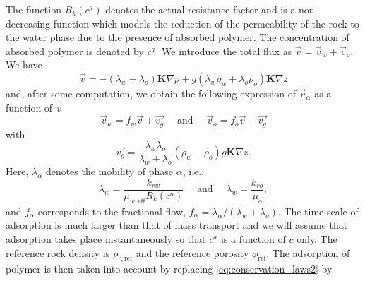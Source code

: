 \documentclass[11pt]{amsart}
\newcommand{\cads}{c^a}
\newcommand{\eff}{\mathrm{eff}}
\newcommand{\Kb}{{\bm{K}}}
\begin{document}
The function $R_k(\cads)$ denotes the actual resistance factor and is a non-decreasing function
which models the reduction of the permeability of the rock to the water phase due to the presence of
absorbed polymer. The concentration of absorbed polymer is denoted by $\cads$. We introduce the
total flux as $\vec{v} = \vec{v}_w + \vec{v}_o$. We have
\begin{equation*}
  \vec{v} = -(\lambda_w + \lambda_o)\Kb\nabla p + g(\lambda_w\rho_w + \lambda_o\rho_o)\Kb\nabla z 
\end{equation*}
and, after some computation, we obtain the following expression of $\vec{v}_\alpha$ as a function of
$\vec{v}$
\begin{equation}
  \label{eq:valphav}
  \vec{v}_w = f_w \vec{v} + \vec{v_g}\quad\text{ and }\quad  \vec{v}_o = f_o \vec{v} - \vec{v_g}
\end{equation}
with
\begin{equation}
  \label{eq:gravterm}
  \vec{v_g} = \frac{\lambda_w\lambda_{o}}{\lambda_w+\lambda_{o}}(\rho_w-\rho_{o})g\Kb\nabla z.
\end{equation}
Here, $\lambda_\alpha$ denotes the mobility of phase $\alpha$, i.e.,
\begin{equation*}
  \lambda_w = \frac{k_{rw}}{\mu_{w,\eff}R_k(\cads)}\quad\text{ and }\quad  \lambda_w = \frac{k_{ro}}{\mu_{o}},
\end{equation*}
and $f_\alpha$ corresponds to the fractional flow, $f_\alpha =\lambda_{\alpha}/(\lambda_{w} +
\lambda_{o})$. The time scale of adsorption is much larger than that of mass transport and we will
assume that adsorption takes place instantaneously so that $\cads$ is a function of $c$ only.  The
reference rock density is $\rho_{r, \text{ref}}$ and the reference porosity $\phi_\text{ref}$.  The
adsorption of polymer is then taken into account by replacing \eqref{eq:conservation_laws2} by
\end{document}
